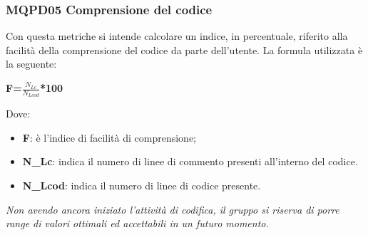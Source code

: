 \subsubsection{MQPD05 Comprensione del codice}\label{QualitàDelProdottoManutenibilitàMetricheMQPD05}
Con questa metriche si intende calcolare un indice, in percentuale, riferito alla facilità della comprensione del codice da parte dell'utente.
La formula utilizzata è la seguente:
\begin{center}
	\textbf{F=$\frac{N_{Lc}}{N_{Lcod}}$*100}
\end{center}
Dove:
\begin{itemize}
	\item \textbf{F}: è l'indice di facilità di comprensione;
	\item \textbf{N\_{Lc}}: indica il numero di linee di commento presenti all'interno del codice.
	\item \textbf{N\_{Lcod}}: indica il numero di linee di codice presente.
\end{itemize}

\textit{Non avendo ancora iniziato l'attività di codifica, il gruppo si riserva di porre range di valori ottimali ed accettabili in un futuro momento.}